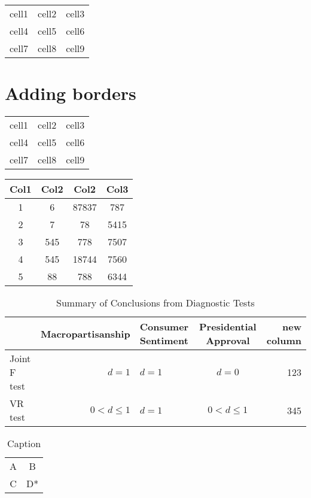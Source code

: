 \documentclass{article}
\begin{document}
\begin{center}
\begin{tabular}{c c c}
 cell1 & cell2 & cell3 \\ 
 cell4 & cell5 & cell6 \\  
 cell7 & cell8 & cell9    
\end{tabular}
\end{center}

\section{Adding borders}

\begin{center}
\begin{tabular}{|c|c|c|} 
 \hline
 cell1 & cell2 & cell3 \\ 
 cell4 & cell5 & cell6 \\ 
 cell7 & cell8 & cell9 \\ 
 \hline
\end{tabular}
\end{center}


\begin{center}
 \begin{tabular}{||c c c c||} 
 \hline
 Col1 & Col2 & Col2 & Col3 \\ [0.5ex] 
 \hline\hline
 1 & 6 & 87837 & 787 \\ 
 \hline
 2 & 7 & 78 & 5415 \\
 \hline
 3 & 545 & 778 & 7507 \\
 \hline
 4 & 545 & 18744 & 7560 \\
 \hline
 5 & 88 & 788 & 6344 \\  
 \hline
\end{tabular}
\end{center}


\begin{table}[t]
\caption{Summary of Conclusions from Diagnostic Tests}
\begin{tabular}{|l|rl|c|r}
\hline
\hline
& \textbf{Macropartisanship} & Consumer Sentiment & Presidential Approval & new column\\
\hline
Joint F test & $d=1$ & $d=1$ & $d=0$ & 123\\
VR test & $0<d\leq1$ & $d=1$ & $0<d\leq1$ &345 \\
\hline
\end{tabular}
\end{table}

\begin{table}[]
    \centering
    \begin{tabular}{|c|c|}
    \hline
         A&B  \\
         C& D* \\
    \hline
    \end{tabular}
    \caption{Caption}
    \label{tab:my_label}
\end{table}
\end{document}
